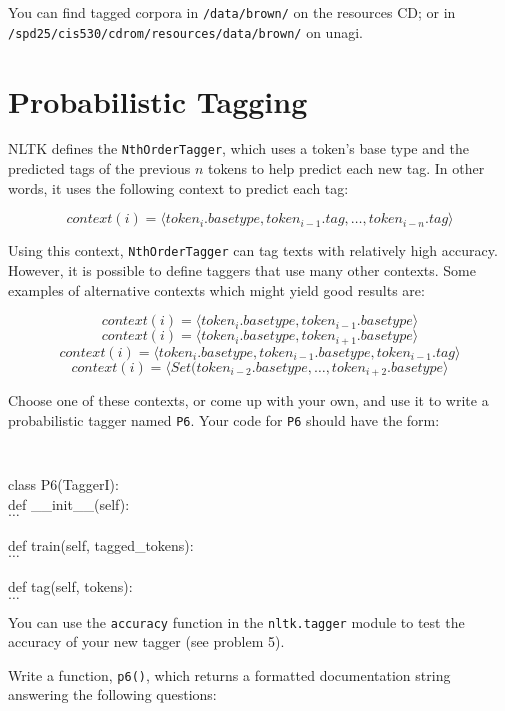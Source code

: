 \documentclass{cis530}
\begin{document}
You can find tagged corpora in \texttt{/data/brown/} on the
resources CD; or in
\texttt{/spd25/cis530/cdrom/resources/data/brown/} on unagi.

\newpage
\section{Probabilistic Tagging}

NLTK defines the \texttt{NthOrderTagger}, which uses a token's base
type and the predicted tags of the previous $n$ tokens to help predict
each new tag.  In other words, it uses the following context to
predict each tag:

$$context(i) = \langle token_i.basetype, token_{i-1}.tag, \ldots, token_{i-n}.tag\rangle$$

Using this context, \texttt{NthOrderTagger} can tag texts with
relatively high accuracy.  However, it is possible to define taggers
that use many other contexts.  Some examples of alternative contexts
which might yield good results are:

$$context(i) = \langle token_i.basetype, token_{i-1}.basetype\rangle$$
$$context(i) = \langle token_i.basetype, token_{i+1}.basetype\rangle$$
$$context(i) = \langle token_i.basetype, token_{i-1}.basetype, token_{i-1}.tag\rangle$$
$$context(i) = \langle Set(token_{i-2}.basetype, \ldots, token_{i+2}.basetype\rangle$$

Choose one of these contexts, or come up with your own, and use it to
write a probabilistic tagger named \texttt{P6}.  Your code for
\texttt{P6} should have the form:

{\tt
\begin{tabbing}
class P6(TaggerI):\\
\qquad def \_\_init\_\_(self):\\
\qquad\qquad $\ldots$\\
\\
\qquad def train(self, tagged\_tokens):\\
\qquad\qquad $\ldots$\\
\\
\qquad def tag(self, tokens):\\
\qquad\qquad $\ldots$
\end{tabbing}
}

You can use the \texttt{accuracy} function in the \texttt{nltk.tagger}
module to test the accuracy of your new tagger (see problem 5).

Write a function, \texttt{p6()}, which returns a formatted
documentation string answering the following questions:
\end{document}

